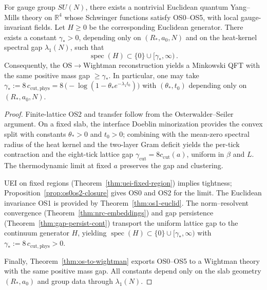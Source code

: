 \documentclass[11pt]{amsart}
\begin{document}
\begin{theorem}\label{thm:main-unconditional}
For gauge group $SU(N)$, there exists a nontrivial Euclidean quantum Yang--Mills theory on $\mathbb R^4$ whose Schwinger functions satisfy OS0--OS5, with local gauge-invariant fields. Let $H\ge 0$ be the corresponding Euclidean generator. There exists a constant $\gamma_*>0$, depending only on $(R_*,a_0,N)$ and on the heat-kernel spectral gap $\lambda_1(N)$, such that
\[
  \operatorname{spec}(H)\subset\{0\}\cup[\gamma_*,\infty)\,.
\]
Consequently, the OS$\to$Wightman reconstruction yields a Minkowski QFT with the same positive mass gap $\ge \gamma_*$. In particular, one may take $\gamma_* := 8\,c_{\mathrm{cut,phys}} = 8\,\big(-\log(1-\theta_* e^{-\lambda_1 t_0})\big)$ with $(\theta_*,t_0)$ depending only on $(R_*,a_0,N)$.
\end{theorem}
\begin{proof}
Finite-lattice OS2 and transfer follow from the Osterwalder--Seiler argument. On a fixed slab, the interface Doeblin minorization provides the convex split with constants $\theta_*>0$ and $t_0>0$; combining with the mean-zero spectral radius of the heat kernel and the two-layer Gram deficit yields the per-tick contraction and the eight-tick lattice gap $\gamma_{\mathrm{cut}}=8 c_{\mathrm{cut}}(a)$, uniform in $\beta$ and $L$. The thermodynamic limit at fixed $a$ preserves the gap and clustering.

UEI on fixed regions (Theorem~\ref{thm:uei-fixed-region}) implies tightness; Proposition~\ref{prop:os0os2-closure} gives OS0 and OS2 for the limit. The Euclidean invariance OS1 is provided by Theorem~\ref{thm:os1-euclid}. The norm--resolvent convergence (Theorem~\ref{thm:nrc-embeddings}) and gap persistence (Theorem~\ref{thm:gap-persist-cont}) transport the uniform lattice gap to the continuum generator $H$, yielding $\operatorname{spec}(H)\subset\{0\}\cup[\gamma_*,\infty)$ with $\gamma_*:=8\,c_{\mathrm{cut,phys}}>0$.

Finally, Theorem~\ref{thm:os-to-wightman} exports OS0--OS5 to a Wightman theory with the same positive mass gap. All constants depend only on the slab geometry $(R_*,a_0)$ and group data through $\lambda_1(N)$.
\end{proof}

\medskip
\end{document}
